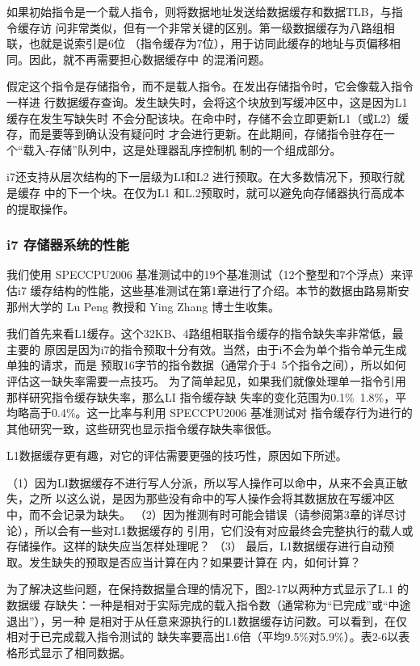 如果初始指令是一个载人指令，则将数据地址发送给数据缓存和数据TLB，与指令缓存访
问非常类似，但有一个非常关键的区别。第一级数据缓存为八路组相联，也就是说索引是6位
（指令缓存为7位），用于访同此缓存的地址与页偏移相同。因此，就不再需要担心数据缓存中
的混淆问题。

假定这个指令是存储指令，而不是载人指令。在发出存储指令时，它会像载入指令一样进
行数据缓存查询。发生缺失时，会将这个块放到写缓冲区中，这是因为L1缓存在发生写缺失时
不会分配该块。在命中时，存储不会立即更新L1（或L2）缓存，而是要等到确认没有疑问时
才会进行更新。在此期间，存储指令驻存在一个“载入-存储”队列中，这是处理器乱序控制机
制的一个组成部分。

i7还支持从层次结构的下一层级为LI和L2 进行预取。在大多数情况下，预取行就是缓存
中的下一个块。在仅为L1 和L.2预取时，就可以避免向存储器执行高成本的提取操作。

\subsubsection{i7 存储器系统的性能}

我们使用 SPECCPU2006 基准测试中的19个基准测试（12个整型和7个浮点）来评估i7
缓存结构的性能，这些基准测试在第1章进行了介绍。本节的数据由路易斯安那州大学的 Lu
Peng 教授和 Ying Zhang 博士生收集。

我们首先来看L1缓存。这个32KB、4路组相联指令缓存的指令缺失率非常低，最主要的
原因是因为i7的指令预取十分有效。当然，由于i不会为单个指令单元生成单独的请求，而是
预取16字节的指令数据（通常介于4~5个指令之间），所以如何评估这一缺失率需要一点技巧。
为了简单起见，如果我们就像处理单一指令引用那样研究指令缓存缺失率，那么LI 指令缓存缺
失率的变化范围为0.1\%~1.8\%，平均略高于0.4\%。这一比率与利用 SPECCPU2006 基准测试对
指令缓存行为进行的其他研究一致，这些研究也显示指令缓存缺失率很低。

L1数据缓存更有趣，对它的评估需要更强的技巧性，原因如下所述。

（1）因为LI数据缓存不进行写人分派，所以写人操作可以命中，从来不会真正敏失，之所
以这么说，是因为那些没有命中的写人操作会将其数据放在写缓冲区中，而不会记录为缺失。
（2）因为推测有时可能会错误（请参阅第3章的详尽讨论），所以会有一些对L1数据缓存的
引用，它们没有对应最终会完整执行的载人或存储操作。这样的缺失应当怎样处理呢？
（3） 最后，L1数据缓存进行自动预取。发生缺失的预取是否应当计算在内？如果要计算在
内，如何计算？

为了解决这些问题，在保持数据量合理的情况下，图2-17以两种方式显示了L.1 的数据缓
存缺失：一种是相对于实际完成的载入指令数（通常称为“已完成”或“中途退出”），另一种
是相对于从任意来源执行的L1数据缓存访问数。可以看到，在仅相对于已完成载入指令测试的
缺失率要高出1.6倍（平均9.5\%对5.9\%）。表2-6以表格形式显示了相同数据。


